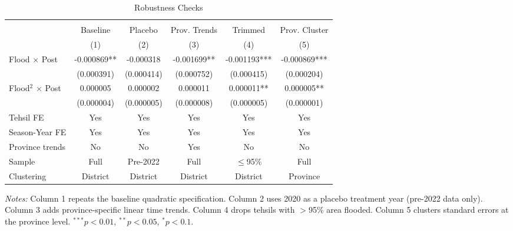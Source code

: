 \begin{table}[htbp]
\centering
\caption{Robustness Checks}
\label{tab:robust}
\small
\begin{tabular}{lccccc}
\hline\hline
\\[-1.8ex]
 & Baseline & Placebo & Prov. Trends & Trimmed & Prov. Cluster \\
 & (1) & (2) & (3) & (4) & (5) \\
\hline
Flood $\times$ Post & -0.000869** & -0.000318 & -0.001699** & -0.001193*** & -0.000869*** \\
 & (0.000391) & (0.000414) & (0.000752) & (0.000415) & (0.000204) \\
Flood$^2$ $\times$ Post & 0.000005 & 0.000002 & 0.000011 & 0.000011** & 0.000005** \\
 & (0.000004) & (0.000005) & (0.000008) & (0.000005) & (0.000001) \\
\hline
Tehsil FE & Yes & Yes & Yes & Yes & Yes \\
Season-Year FE & Yes & Yes & Yes & Yes & Yes \\
Province trends & No & No & Yes & No & No \\
Sample & Full & Pre-2022 & Full & $\leq$95\% & Full \\
Clustering & District & District & District & District & Province \\
\hline\hline
\end{tabular}
\par\vspace{0.3em}
\small
\textit{Notes:} Column 1 repeats the baseline quadratic specification. Column 2 uses 2020 as a placebo treatment year (pre-2022 data only). Column 3 adds province-specific linear time trends. Column 4 drops tehsils with $>$95\% area flooded. Column 5 clusters standard errors at the province level. $^{***}p<0.01$, $^{**}p<0.05$, $^{*}p<0.1$.

\end{table}
